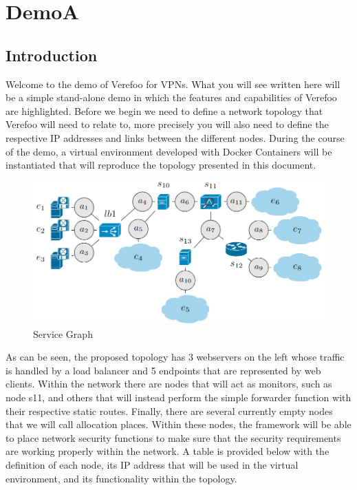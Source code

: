 \chapter{DemoA} \label{ch:DemoA}


\section{Introduction}
Welcome to the demo of Verefoo for VPNs. What you will see written here will be a simple stand-alone demo in which the features and capabilities of Verefoo are highlighted.
Before we begin we need to define a network topology that Verefoo will need to relate to, more precisely you will also need to define the respective IP addresses and links between the different nodes.  During the course of the demo, a virtual environment developed with Docker Containers will be instantiated that will reproduce the topology presented in this document.

\begin{figure}[h]  %
    \centering
    \includegraphics[width=1\textwidth]{VPN_AG.PNG} 
    \caption{Service Graph}
    \label{fig:ServiceGraph}
\end{figure}
As can be seen, the proposed topology has 3 webservers on the left whose traffic is handled by a load balancer and 5 endpoints that are represented by web clients. Within the network there are nodes that will act as monitors, such as node s11, and others that will instead perform the simple forwarder function with their respective static routes. Finally, there are several currently empty nodes that we will call allocation places. Within these nodes, the framework will be able to place network security functions to make sure that the security requirements are working properly within the network. A table is provided below with the definition of each node, its IP address that will be used in the virtual environment, and its functionality within the topology.

